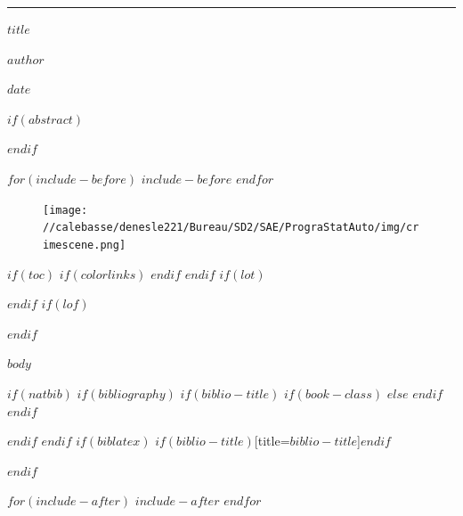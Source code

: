 \documentclass[$if(fontsize)$$fontsize$,$endif$]{article}
\begin{document}
\hrule

\vspace{1cm}



\begin{center}
{\LARGE \bf $title$}

\vspace{0.2cm}

{\large $author$}

\vspace{0.2cm}

$date$

\end{center}

\vspace{1cm}


$if(abstract)$
\begin{abstract}
\noindent $abstract$
\end{abstract}
$endif$

$for(include-before)$
$include-before$
$endfor$

\vspace{2cm}

\begin{figure}[h]
  \centering
  \texttt{[image: //calebasse/denesle221/Bureau/SD2/SAE/PrograStatAuto/img/crimescene.png]}
\end{figure}

\vspace{2cm}

$if(toc)$
{
$if(colorlinks)$
\hypersetup{linkcolor=$if(toccolor)$$toccolor$$else$black$endif$}
$endif$
\setcounter{tocdepth}{$toc-depth$}
\tableofcontents
}
$endif$
$if(lot)$
\listoftables
$endif$
$if(lof)$
\listoffigures
$endif$

$body$

$if(natbib)$
$if(bibliography)$
$if(biblio-title)$
$if(book-class)$
\renewcommand\bibname{$biblio-title$}
$else$
\renewcommand\refname{$biblio-title$}
$endif$
$endif$


$endif$
$endif$
$if(biblatex)$
\printbibliography$if(biblio-title)$[title=$biblio-title$]$endif$

$endif$

$for(include-after)$
$include-after$
$endfor$
\end{document}
